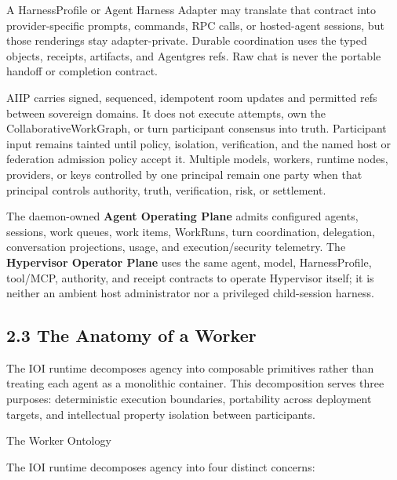 \documentclass[
  11pt,
]{article}
\begin{document}
A HarnessProfile or Agent Harness Adapter may translate that contract into
provider-specific prompts, commands, RPC calls, or hosted-agent sessions, but
those renderings stay adapter-private. Durable coordination uses the typed
objects, receipts, artifacts, and Agentgres refs. Raw chat is never the
portable handoff or completion contract.

AIIP carries signed, sequenced, idempotent room updates and permitted refs
between sovereign domains. It does not execute attempts, own the
CollaborativeWorkGraph, or turn participant consensus into truth. Participant
input remains tainted until policy, isolation, verification, and the named
host or federation admission policy accept it. Multiple models, workers,
runtime nodes, providers, or keys controlled by one principal remain one party
when that principal controls authority, truth, verification, risk, or
settlement.

The daemon-owned \textbf{Agent Operating Plane} admits configured agents,
sessions, work queues, work items, WorkRuns, turn coordination, delegation,
conversation projections, usage, and execution/security telemetry. The
\textbf{Hypervisor Operator Plane} uses the same agent, model,
HarnessProfile, tool/MCP, authority, and receipt contracts to operate
Hypervisor itself; it is neither an ambient host administrator nor a
privileged child-session harness.

\hypertarget{the-anatomy-of-a-worker}{%
\subsection{2.3 The Anatomy of a Worker}\label{the-anatomy-of-a-worker}}

The IOI runtime decomposes agency into composable primitives rather than
treating each agent as a monolithic container. This decomposition serves
three purposes: deterministic execution boundaries, portability across
deployment targets, and intellectual property isolation between
participants.

The Worker Ontology

The IOI runtime decomposes agency into four distinct concerns:
\end{document}
